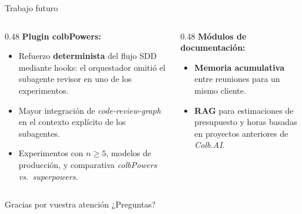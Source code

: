 \documentclass[t]{beamer}
\begin{document}
\begin{frame}{Trabajo futuro}
    \begin{columns}[T]
        \begin{column}{0.48\textwidth}
            \textbf{Plugin colbPowers:}
            \vspace{0.1cm}
            \begin{itemize}
                \footnotesize
                \item Refuerzo \textbf{determinista} del flujo SDD mediante hooks: el orquestador omitió el subagente revisor en uno de los experimentos.
                \vspace{0.1cm}
                \item Mayor integración de \textit{code-review-graph} en el contexto explícito de los subagentes.
                \vspace{0.1cm}
                \item Experimentos con $n \geq 5$, modelos de producción, y comparativa \textit{colbPowers vs.\ superpowers}.
            \end{itemize}
        \end{column}
        \begin{column}{0.48\textwidth}
            \textbf{Módulos de documentación:}
            \vspace{0.1cm}
            \begin{itemize}
                \footnotesize
                \item \textbf{Memoria acumulativa} entre reuniones para un mismo cliente.
                \vspace{0.1cm}
                \item \textbf{RAG} para estimaciones de presupuesto y horas basadas en proyectos anteriores de \textit{Colb.AI}.
            \end{itemize}
        \end{column}
    \end{columns}
\end{frame}

\begin{frame}
    \centering
    \vfill
    \Huge {Gracias por vuestra atención}
    \Large {¿Preguntas?}
    \vfil
\end{frame}
\end{document}
